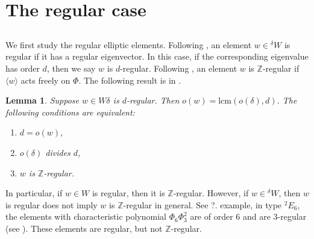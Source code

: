 \documentclass[10pt,leqno]{article}
\newtheorem{lemma}[equation]{Lemma}
\renewcommand{\sec}[1]{\section{#1}
\renewcommand{\theequation}{\thesection.\arabic{equation}}
  \setcounter{equation}{0}}
\renewcommand{\sec}[1]{\section{#1}
\renewcommand{\theequation}{\thesection.\arabic{equation}}
  \setcounter{equation}{0}}
\begin{document}
\sec{The regular case}

\subsection{} We first study the regular elliptic elements. Following
\cite{springer_regular}, an element $w \in {}^{\delta} W$ is regular if it has a
regular eigenvector. In this case, if the corresponding eigenvalue has
order $d$, then we say $w$ is $d$-regular. Following \cite{rgly}, an
element $w$ is $\mathbb Z$-regular if $\langle w\rangle$ acts freely
on $\Phi$. The following result is in \cite[Lemma 7.2]{AH}.

\begin{lemma} Suppose $w\in W\delta$ is $d$-regular.  Then
$o(w)=\text{lcm}(o(\delta),d)$.  The following conditions are
equivalent:
	\begin{enumerate}
		\item $d=o(w)$,
		\item $o(\delta)$ divides $d$,
		\item $w$ is $\mathbb Z$-regular.
	\end{enumerate}
\end{lemma}

In particular, if $w \in W$ is regular, then it is $\mathbb
Z$-regular. However, if $w \in {}^{\delta} W$, then $w$ is regular
does not imply $w$ is $\mathbb Z$-regular in general. See ?. %
example, in type ${}^2 E_6$, the elements with characteristic
polynomial $\Phi_6 \Phi_3^2$ are of order $6$ and are $3$-regular (see
\cite[Table 8]{springer_regular}). These elements are regular, but not $\mathbb
Z$-regular.
\end{document}
